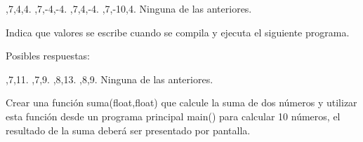 \documentclass[12pt,answers]{exam}
\begin{document}
\begin{questions}
\begin{checkboxes}
,7,4,4.
,7,-4,-4.
,7,4,-4.
,7,-10,4.
\CorrectChoice   Ninguna de las anteriores.
\end{checkboxes}



\newpage
\question[25] Indica que valores se escribe cuando se compila y ejecuta el siguiente programa. 


 




Posibles respuestas:\\

\begin{checkboxes}
,7,11.
,7,9.
,8,13.
,8,9.
\CorrectChoice   Ninguna de las anteriores.
\end{checkboxes}


    
\newpage
\question[25] Crear una función suma(float,float) que calcule la suma de dos números y utilizar esta función desde un programa principal main() para calcular 10 números, el resultado de la suma deberá ser presentado por pantalla. 
    


 



\end{questions}
\end{document}
